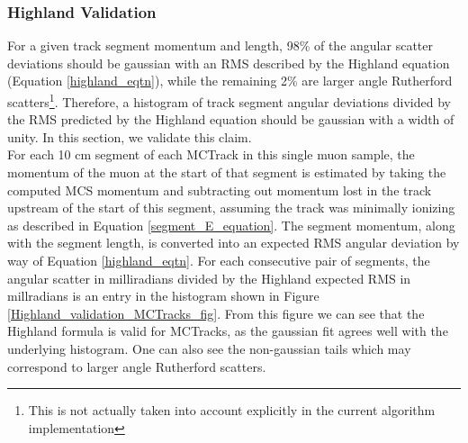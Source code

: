 \subsubsection{Highland Validation}\label{Highland_Validation_MCTrack_section}
For a given track segment momentum and length, 98\% of the angular scatter deviations should be gaussian with an RMS described by the Highland equation (Equation \ref{highland_eqtn}), while the remaining 2\% are larger angle Rutherford scatters\cite{highland}\footnote{This is not actually taken into account explicitly in the current algorithm implementation}. Therefore, a histogram of track segment angular deviations divided by the RMS predicted by the Highland equation should be gaussian with a width of unity. In this section, we validate this claim.\\

For each 10 cm segment of each {\sc MCTrack} in this single muon sample, the momentum of the muon at the start of that segment is estimated by taking the computed MCS momentum and subtracting out momentum lost in the track upstream of the start of this segment, assuming the track was minimally ionizing as described in Equation \ref{segment_E_equation}. The segment momentum, along with the segment length, is converted into an expected RMS angular deviation by way of Equation \ref{highland_eqtn}. For each consecutive pair of segments, the angular scatter in milliradians divided by the Highland expected RMS in millradians is an entry in the histogram shown in Figure \ref{Highland_validation_MCTracks_fig}. From this figure we can see that the Highland formula is valid for {\sc MCTracks}, as the gaussian fit agrees well with the underlying histogram. One can also see the non-gaussian tails which may correspond to larger angle Rutherford scatters.

